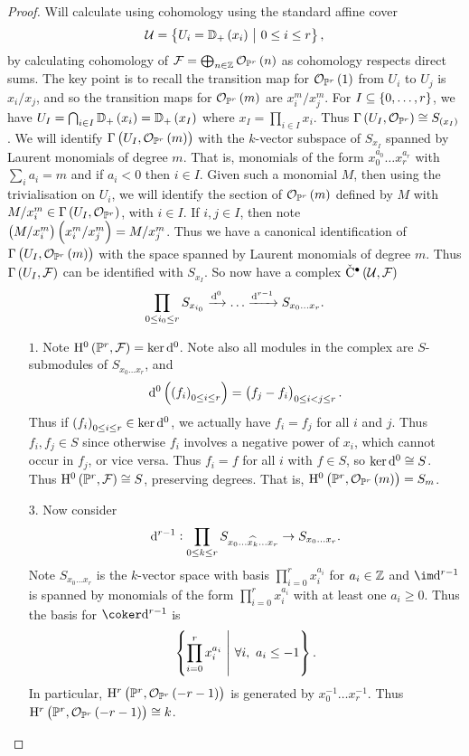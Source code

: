 \begin{proof}
Will calculate using \Cech cohomology using the standard affine cover
$$ \UUU = \cbr{U_i = \DD_+\br{x_i} \st 0 \le i \le r}, $$
by calculating cohomology of $ \FFF = \bigoplus_{n \in \ZZ} \OOO_{\PP^r}\br{n} $ as \Cech cohomology respects direct sums. The key point is to recall the transition map for $ \OOO_{\PP^r}\br{1} $ from $ U_i $ to $ U_j $ is $ x_i / x_j $, and so the transition maps for $ \OOO_{\PP^r}\br{m} $ are $ x_i^m / x_j^m $. For $ I \subseteq \cbr{0, \dots, r} $, we have $ U_I = \bigcap_{i \in I} \DD_+\br{x_i} = \DD_+\br{x_I} $ where $ x_I = \prod_{i \in I} x_i $. Thus $ \Gamma\br{U_I, \OOO_{\PP^r}} \cong S_{\br{x_I}} $. We will identify $ \Gamma\br{U_I, \OOO_{\PP^r}\br{m}} $ with the $ k $-vector subspace of $ S_{x_I} $ spanned by Laurent monomials of degree $ m $. That is, monomials of the form $ x_0^{a_0} \dots x_r^{a_r} $ with $ \sum_i a_i = m $ and if $ a_i < 0 $ then $ i \in I $. Given such a monomial $ M $, then using the trivialisation on $ U_i $, we will identify the section of $ \OOO_{\PP^r}\br{m} $ defined by $ M $ with $ M / x_i^m \in \Gamma\br{U_I, \OOO_{\PP^r}} $, with $ i \in I $. If $ i, j \in I $, then note $ \br{M / x_i^m}\br{x_i^m / x_j^m} = M / x_j^m $. Thus we have a canonical identification of $ \Gamma\br{U_I, \OOO_{\PP^r}\br{m}} $ with the space spanned by Laurent monomials of degree $ m $. Thus $ \Gamma\br{U_I, \FFF} $ can be identified with $ S_{x_I} $. So now have a \Cech complex $ \vC^\bullet\br{\UUU, \FFF} $
$$ \prod_{0 \le i_0 \le r} S_{x_{i_0}} \xrightarrow{\mathrm{d}^0} \dots \xrightarrow{\mathrm{d}^{r - 1}} S_{x_0 \dots x_r}. $$
\begin{itemize}
\item[$ 1 $.] Note $ \H^0\br{\PP^r, \FFF} = \ker \d^0 $. Note also all modules in the \Cech complex are $ S $-submodules of $ S_{x_0 \dots x_r} $, and
$$ \d^0\br{\br{f_i}_{0 \le i \le r}} = \br{f_j - f_i}_{0 \le i < j \le r}. $$
Thus if $ \br{f_i}_{0 \le i \le r} \in \ker \d^0 $, we actually have $ f_i = f_j $ for all $ i $ and $ j $. Thus $ f_i, f_j \in S $ since otherwise $ f_i $ involves a negative power of $ x_i $, which cannot occur in $ f_j $, or vice versa. Thus $ f_i = f $ for all $ i $ with $ f \in S $, so $ \ker \mathrm{d}^0 \cong S $. Thus $ \H^0\br{\PP^r, \FFF} \cong S $, preserving degrees. That is, $ \H^0\br{\PP^r, \OOO_{\PP^r}\br{m}} = S_m $.
\item[$ 3 $.] Now consider
$$ \mathrm{d}^{r - 1} : \prod_{0 \le k \le r} S_{x_0 \dots \widehat{x_k} \dots x_r} \to S_{x_0 \dots x_r}. $$
Note $ S_{x_0 \dots x_r} $ is the $ k $-vector space with basis $ \prod_{i = 0}^r x_i^{a_i} $ for $ a_i \in \mathbb{Z} $ and $ \im \d^{r - 1} $ is spanned by monomials of the form $ \prod_{i = 0}^r x_i^{a_i} $ with at least one $ a_i \ge 0 $. Thus the basis for $ \coker \d^{r - 1} $ is
$$ \cbr{\prod_{i = 0}^r x_i^{a_i} \st \forall i, \ a_i \le -1}. $$
In particular, $ \H^r\br{\PP^r, \OOO_{\PP^r}\br{-r - 1}} $ is generated by $ x_0^{-1} \dots x_r^{-1} $. Thus $ \H^r\br{\PP^r, \OOO_{\PP^r}\br{-r - 1}} \cong k $.


\end{itemize}
\end{proof}
